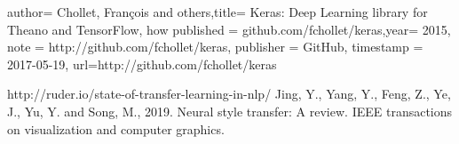 \documentclass[11pt]{report}           %
\begin{document}
\begin{thebibliography}{80}
  author= {Chollet, Fran\c{c}ois and others},title= {Keras: Deep Learning library for {T}heano and {T}ensorFlow}, how published = {github.com/fchollet/keras},year= {2015}, note = {http://github.com/fchollet/keras},
  publisher    = {GitHub}, timestamp    = {2017-05-19}, url={http://github.com/fchollet/keras}
  
  http://ruder.io/state-of-transfer-learning-in-nlp/
  Jing, Y., Yang, Y., Feng, Z., Ye, J., Yu, Y. and Song, M., 2019. Neural style transfer: A review. IEEE transactions on visualization and computer graphics.
  
\end{thebibliography}
\end{document}
